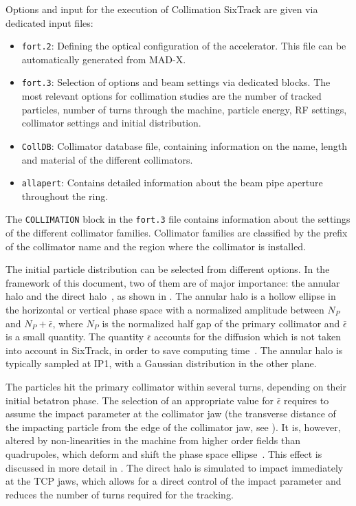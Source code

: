 Options and input for the execution of Collimation SixTrack are given via dedicated input files:
\begin{itemize}
  \item \texttt{fort.2}: Defining the optical configuration of the accelerator. This file can be automatically generated from MAD-X.
  \item \texttt{fort.3}: Selection of options and beam settings via dedicated blocks. The most relevant options for collimation studies are the number of tracked particles, number of turns through the machine, particle energy, RF settings, collimator settings and initial distribution. 
 \item \texttt{CollDB}: Collimator database file, containing information on the name, length and material of the different collimators.
 \item \texttt{allapert}: Contains detailed information about the beam pipe aperture throughout the ring.
\end{itemize}

The \texttt{COLLIMATION} block in the \texttt{fort.3} file contains information about the settings of the different collimator families. Collimator families are classified by the prefix of the collimator name and the region where the collimator is installed. 




The initial particle distribution can be selected from different options. In the framework of this document, two of them are of major importance: the annular halo and the direct halo~\cite{Bruce2014a}, as shown in . The annular halo is a hollow ellipse in the horizontal or vertical phase space with a normalized amplitude between $N_P$ and $N_P+\bar{\epsilon}$, where $N_P$ is the normalized half gap of the primary collimator and $\bar{\epsilon}$ is a small quantity. The quantity $\bar{\epsilon}$ accounts for the diffusion which is not taken into account in SixTrack, in order to save computing time~\cite{Bruce2014a}. The annular halo is typically sampled at IP1, with a Gaussian distribution in the other plane. 

The particles hit the primary collimator within several turns, depending on their initial betatron phase. The selection of an appropriate value for $\bar{\epsilon}$ requires to assume the impact parameter at the collimator jaw (the transverse distance of the impacting particle from the edge of the collimator jaw, see ). It is, however, altered by non-linearities in the machine from higher order fields than quadrupoles, which deform and shift the phase space ellipse~\cite{Bruce2014a}. This effect is discussed in more detail in . The direct halo is simulated to impact immediately at the TCP jaws, which allows for a direct control of the impact parameter and reduces the number of turns required for the tracking.


